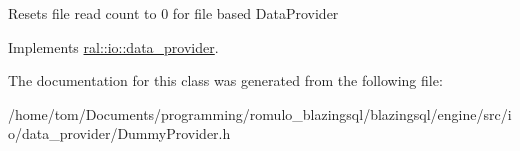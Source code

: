 Resets file read count to 0 for file based Data\+Provider 

Implements \hyperlink{classral_1_1io_1_1data__provider_ab762cbdb9fd702a61b48785c84e91536}{ral\+::io\+::data\+\_\+provider}.



The documentation for this class was generated from the following file\+:\begin{DoxyCompactItemize}
\item 
/home/tom/\+Documents/programming/romulo\+\_\+blazingsql/blazingsql/engine/src/io/data\+\_\+provider/Dummy\+Provider.\+h\end{DoxyCompactItemize}
